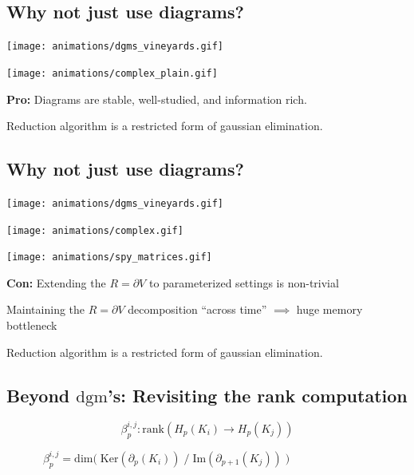 \documentclass[
  letterpaper,
  DIV=11,
  numbers=noendperiod,
  oneside]{scrartcl}
\begin{document}
\subsection{Why not just use diagrams?}\label{why-not-just-use-diagrams}

\texttt{[image: animations/dgms\_vineyards.gif]}

\texttt{[image: animations/complex\_plain.gif]}

\textbf{Pro:} Diagrams are stable, well-studied, and information rich.

Reduction algorithm is a restricted form of gaussian elimination.

\subsection{Why not just use
diagrams?}\label{why-not-just-use-diagrams-1}

\texttt{[image: animations/dgms\_vineyards.gif]}

\texttt{[image: animations/complex.gif]}

\texttt{[image: animations/spy\_matrices.gif]}

\textbf{Con:} Extending the \(R = \partial V\) to parameterized settings
is non-trivial

Maintaining the \(R = \partial V\) decomposition ``across time''
\(\implies\) huge memory bottleneck


Reduction algorithm is a restricted form of gaussian elimination.

\subsection{\texorpdfstring{Beyond \(\mathrm{dgm}\)'s: Revisiting the
rank
computation}{Beyond \textbackslash mathrm\{dgm\}'s: Revisiting the rank computation}}\label{beyond-mathrmdgms-revisiting-the-rank-computation}

\[ \beta_p^{i,j} : \mathrm{rank}(H_p(K_i) \to H_p(K_j))\]

\(\;\quad\quad\quad\beta_p^{i,j} = \mathrm{dim} \big( \;\mathrm{Ker}(\partial_p(K_i))\; / \;\mathrm{Im}(\partial_{p+1}(K_j)) \; \big )\)
\end{document}
